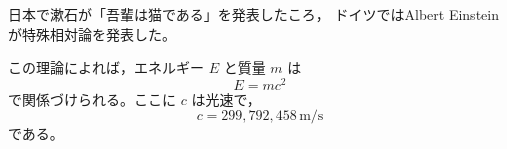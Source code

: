 \documentclass{jsarticle}
\begin{document}
日本で漱石が「吾輩は猫である」を発表したころ，
ドイツではAlbert Einsteinが特殊相対論を発表した。

この理論によれば，エネルギー $E$ と質量 $m$ は
\begin{equation}
  E = mc^{2}
\end{equation}
で関係づけられる。ここに $c$ は光速で，
\begin{equation}
  c = 299{,}792{,}458 \, \mathrm{m/s}
\end{equation}
である。
\end{document}
